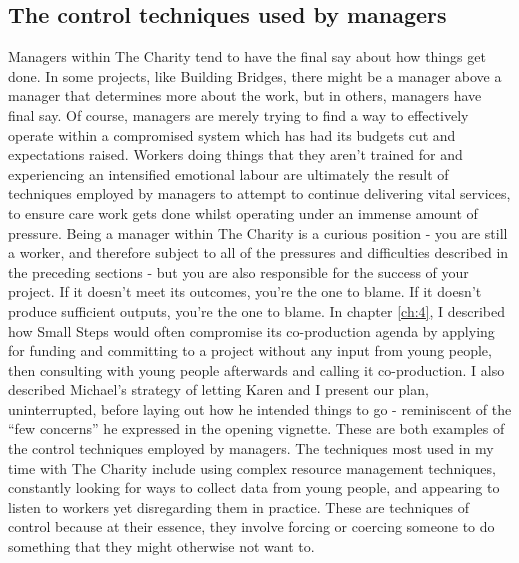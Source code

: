 \subsection{The control techniques used by managers}
Managers within The Charity tend to have the final say about how things get done. In some projects, like Building Bridges, there might be a manager above a manager that determines more about the work, but in others, managers have final say. Of course, managers are merely trying to find a way to effectively operate within a compromised system which has had its budgets cut and expectations raised. Workers doing things that they aren't trained for and experiencing an intensified emotional labour are ultimately the result of techniques employed by managers to attempt to continue delivering vital services, to ensure care work gets done whilst operating under an immense amount of pressure. Being a manager within The Charity is a curious position - you are still a worker, and therefore subject to all of the pressures and difficulties described in the preceding sections - but you are also responsible for the success of your project. If it doesn’t meet its outcomes, you’re the one to blame. If it doesn't produce sufficient outputs, you're the one to blame. In chapter \ref{ch:4}, I described how Small Steps would often compromise its co-production agenda by applying for funding and committing to a project without any input from young people, then consulting with young people afterwards and calling it co-production. I also described Michael’s strategy of letting Karen and I present our plan, uninterrupted, before laying out how he intended things to go - reminiscent of the “few concerns” he expressed in the opening vignette. These are both examples of the control techniques employed by managers. The techniques most used in my time with The Charity include using complex resource management techniques, constantly looking for ways to collect data from young people, and appearing to listen to workers yet disregarding them in practice. These are techniques of control because at their essence, they involve forcing or coercing someone to do something that they might otherwise not want to. 

